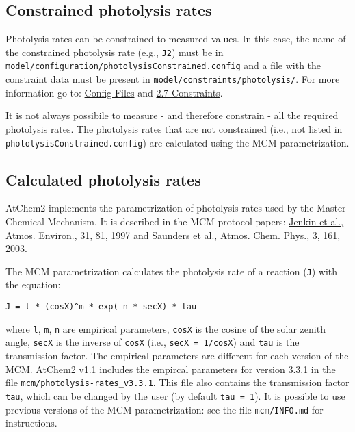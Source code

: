 \subsection{Constrained photolysis rates} \label{subsec:constrained-photolysis-rates}

Photolysis rates can be constrained to measured values. In this case,
the name of the constrained photolysis rate (e.g., \texttt{J2}) must
be in \texttt{model/configuration/photolysisConstrained.config} and a
file with the constraint data must be present in
\texttt{model/constraints/photolysis/}. For more information go to:
\hyperref[sec:config]{Config Files} and \hyperref[sec:constraints]{2.7
  Constraints}.

It is not always possibile to measure - and therefore constrain - all
the required photolysis rates. The photolysis rates that are not
constrained (i.e., not listed in
\texttt{photolysisConstrained.config}) are calculated using the MCM
parametrization.

\subsection{Calculated photolysis rates} \label{subsec:calculated-photolysis-rates}

AtChem2 implements the parametrization of photolysis rates used by the
Master Chemical Mechanism. It is described in the MCM protocol papers:
\href{https://doi.org/10.1016/S1352-2310(96)00105-7}{Jenkin et al.,
  Atmos. Environ., 31, 81, 1997} and
\href{https://doi.org/10.5194/acp-3-161-2003}{Saunders et al., Atmos.
  Chem. Phys., 3, 161, 2003}.

The MCM parametrization calculates the photolysis rate of a reaction
(\texttt{J}) with the equation:

\begin{verbatim}
J = l * (cosX)^m * exp(-n * secX) * tau
\end{verbatim}

where \texttt{l}, \texttt{m}, \texttt{n} are empirical parameters,
\texttt{cosX} is the cosine of the solar zenith angle, \texttt{secX}
is the inverse of \texttt{cosX} (i.e., \texttt{secX\ =\ 1/cosX}) and
\texttt{tau} is the transmission factor. The empirical parameters are
different for each version of the MCM. AtChem2 v1.1 includes the
empircal parameters for
\href{http://mcm.leeds.ac.uk/MCM/parameters/photolysis_param.htt}{version
  3.3.1} in the file \texttt{mcm/photolysis-rates\_v3.3.1}. This file
also contains the transmission factor \texttt{tau}, which can be
changed by the user (by default \texttt{tau\ =\ 1}). It is possible to
use previous versions of the MCM parametrization: see the file
\texttt{mcm/INFO.md} for instructions.

